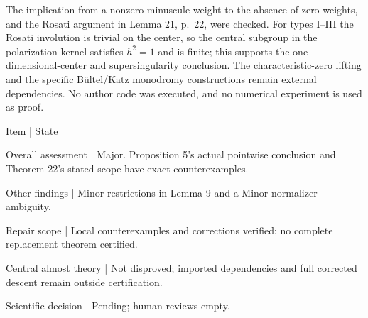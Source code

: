 \documentclass[10pt]{article}
\begin{document}
The implication from a nonzero minuscule weight to the absence of zero weights, and the Rosati argument in Lemma 21, p. 22, were checked. For types I–III the Rosati involution is trivial on the center, so the central subgroup in the polarization kernel satisfies \(h^2=1\) and is finite; this supports the one-dimensional-center and supersingularity conclusion. The characteristic-zero lifting and the specific Bültel/Katz monodromy constructions remain external dependencies. No author code was executed, and no numerical experiment is used as proof.\par
Item | State\par
Overall assessment | Major. Proposition 5’s actual pointwise conclusion and Theorem 22’s stated scope have exact counterexamples.\par
Other findings | Minor restrictions in Lemma 9 and a Minor normalizer ambiguity.\par
Repair scope | Local counterexamples and corrections verified; no complete replacement theorem certified.\par
Central almost theory | Not disproved; imported dependencies and full corrected descent remain outside certification.\par
Scientific decision | Pending; human reviews empty.\par
\end{document}
